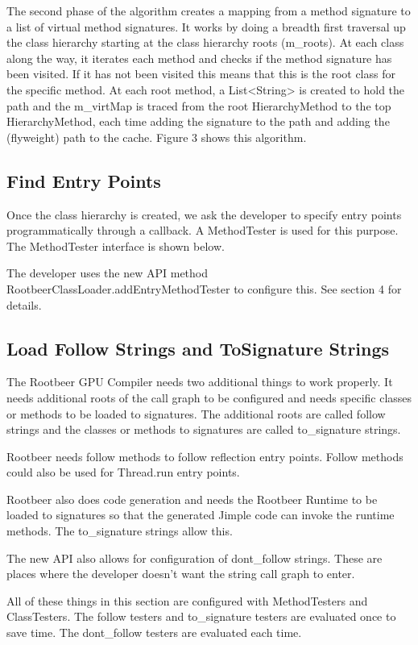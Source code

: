\documentclass[preprint]{sigplanconf}
\begin{document}
The second phase of the algorithm creates a mapping from a method signature to a list of virtual method signatures. It works by doing a breadth first traversal up the class hierarchy starting at the class hierarchy roots (m\_roots). At each class along the way, it iterates each method and checks if the method signature has been visited. If it has not been visited this means that this is the root class for the specific method. At each root method, a List<String> is created to hold the path and the m\_virtMap is traced from the root HierarchyMethod to the top HierarchyMethod, each time adding the signature to the path and adding the (flyweight) path to the cache. Figure 3 shows this algorithm.

\subsection{Find Entry Points}
Once the class hierarchy is created, we ask the developer to specify entry points programmatically through a callback. A MethodTester is used for this purpose. The MethodTester interface is shown below.

The developer uses the new API method RootbeerClassLoader.addEntryMethodTester to configure this. See section 4 for details.

\subsection{Load Follow Strings and ToSignature Strings}
The Rootbeer GPU Compiler needs two additional things to work properly. It needs additional roots of the call graph to be configured and needs specific classes or methods to be loaded to signatures. The additional roots are called follow strings and the classes or methods to signatures are called to\_signature strings.

Rootbeer needs follow methods to follow reflection entry points. Follow methods could also be used for Thread.run entry points.
 
Rootbeer also does code generation and needs the Rootbeer Runtime to be loaded to signatures so that the generated Jimple code can invoke the runtime methods. The to\_signature strings allow this. 

The new API also allows for configuration of dont\_follow strings. These are places where the developer doesn’t want the string call graph to enter.

All of these things in this section are configured with MethodTesters and ClassTesters. The follow testers and to\_signature testers are evaluated once to save time. The dont\_follow testers are evaluated each time.
\end{document}
